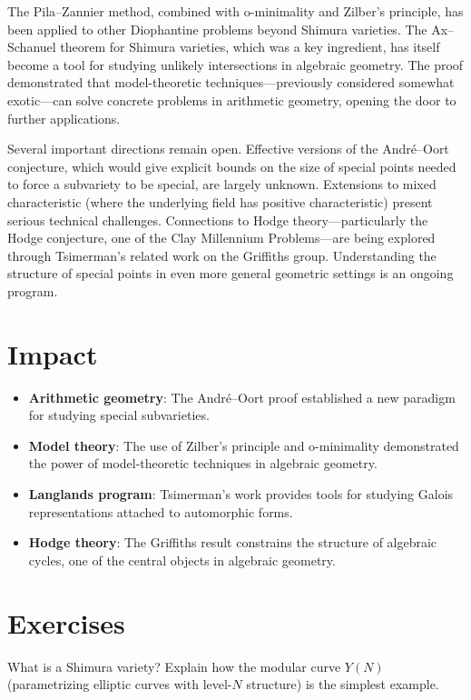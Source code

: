 The Pila--Zannier method, combined with o-minimality and Zilber's principle, has been applied to other Diophantine problems beyond Shimura varieties. The Ax--Schanuel theorem for Shimura varieties, which was a key ingredient, has itself become a tool for studying unlikely intersections in algebraic geometry. The proof demonstrated that model-theoretic techniques---previously considered somewhat exotic---can solve concrete problems in arithmetic geometry, opening the door to further applications.

Several important directions remain open. Effective versions of the Andr\'{e}--Oort conjecture, which would give explicit bounds on the size of special points needed to force a subvariety to be special, are largely unknown. Extensions to mixed characteristic (where the underlying field has positive characteristic) present serious technical challenges. Connections to Hodge theory---particularly the Hodge conjecture, one of the Clay Millennium Problems---are being explored through Tsimerman's related work on the Griffiths group. Understanding the structure of special points in even more general geometric settings is an ongoing program.

\section{Impact}
\begin{itemize}
\item \textbf{Arithmetic geometry}: The André--Oort proof established a new paradigm for studying special subvarieties.
\item \textbf{Model theory}: The use of Zilber's principle and o-minimality demonstrated the power of model-theoretic techniques in algebraic geometry.
\item \textbf{Langlands program}: Tsimerman's work provides tools for studying Galois representations attached to automorphic forms.
\item \textbf{Hodge theory}: The Griffiths result constrains the structure of algebraic cycles, one of the central objects in algebraic geometry.
\end{itemize}

\section{Exercises}

\begin{exercise}[Basic]
What is a Shimura variety? Explain how the modular curve $Y(N)$ (parametrizing elliptic curves with level-$N$ structure) is the simplest example.
\end{exercise}

